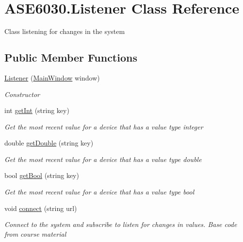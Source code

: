 \hypertarget{class_a_s_e6030_1_1_listener}{}\section{A\+S\+E6030.\+Listener Class Reference}
\label{class_a_s_e6030_1_1_listener}


Class listening for changes in the system  


\subsection*{Public Member Functions}
\begin{DoxyCompactItemize}
\item 
\hyperlink{class_a_s_e6030_1_1_listener_af7626538cc99c4945ea517dbf6eaa249}{Listener} (\hyperlink{class_a_s_e6030_1_1_main_window}{Main\+Window} window)
\begin{DoxyCompactList}\small\item\em Constructor \end{DoxyCompactList}\item 
int \hyperlink{class_a_s_e6030_1_1_listener_a7f82d12db6e97dd86f78dc2f62b23214}{get\+Int} (string key)
\begin{DoxyCompactList}\small\item\em Get the most recent value for a device that has a value type integer \end{DoxyCompactList}\item 
double \hyperlink{class_a_s_e6030_1_1_listener_af8474a0fcd293043899a51cbb3e05d44}{get\+Double} (string key)
\begin{DoxyCompactList}\small\item\em Get the most recent value for a device that has a value type double \end{DoxyCompactList}\item 
bool \hyperlink{class_a_s_e6030_1_1_listener_ac6b8dbf1ed6fd6c3ce0911beef9759ce}{get\+Bool} (string key)
\begin{DoxyCompactList}\small\item\em Get the most recent value for a device that has a value type bool \end{DoxyCompactList}\item 
void \hyperlink{class_a_s_e6030_1_1_listener_a8da1c65da8448e79897a2c06c31e6ca0}{connect} (string url)
\begin{DoxyCompactList}\small\item\em Connect to the system and subscribe to listen for changes in values. Base code from course material \end{DoxyCompactList}\end{DoxyCompactItemize}
